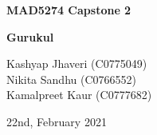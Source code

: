 \begin{titlepage}
    \begin{center}
        \vspace*{2cm}
        \Huge
        \textbf{MAD5274 Capstone 2}
        
        \vspace{2cm}
        \huge 
        \textbf{Gurukul}
        
        \vspace{12cm}
        \Large Kashyap Jhaveri (C0775049)
        \\Nikita Sandhu (C0766552)
        \\Kamalpreet Kaur (C0777682)
        
        \vspace{2cm}
        \Large 22nd, February 2021
        
    \end{center}
\end{titlepage}
